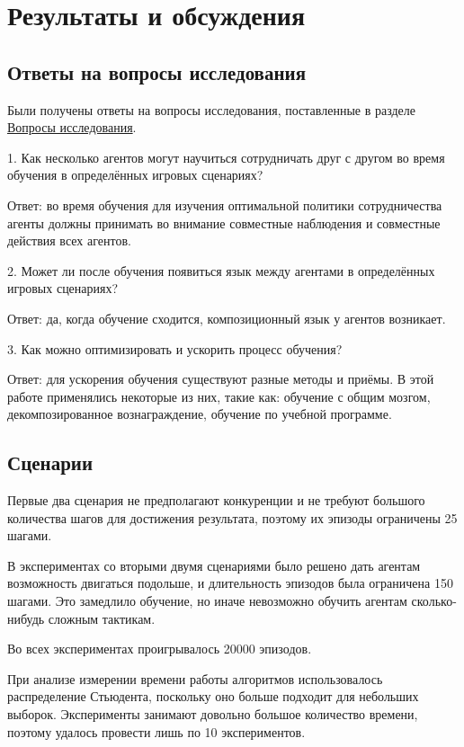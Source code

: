 \chapter{Результаты и обсуждения}


\section{Ответы на вопросы исследования}

Были получены ответы на вопросы исследования, поставленные в разделе \hyperref[intro-questions]{Вопросы исследования}.

1. Как несколько агентов могут научиться сотрудничать друг с другом во время обучения в определённых игровых сценариях?

Ответ: во время обучения для изучения оптимальной политики сотрудничества агенты должны принимать во внимание совместные наблюдения и совместные действия всех агентов.

2. Может ли после обучения появиться язык между агентами в определённых игровых сценариях?

Ответ: да, когда обучение сходится, композиционный язык у агентов возникает.

3. Как можно оптимизировать и ускорить процесс обучения?

Ответ: для ускорения обучения существуют разные методы и приёмы. В этой работе применялись некоторые из них, такие как: обучение с общим мозгом, декомпозированное вознаграждение, обучение по учебной программе.


\section{Сценарии}

Первые два сценария не предполагают конкуренции и не требуют большого количества шагов для достижения результата, поэтому их эпизоды ограничены 25 шагами.

В экспериментах со вторыми двумя сценариями было решено дать агентам возможность двигаться подольше, и длительность эпизодов была ограничена 150 шагами. Это замедлило обучение, но иначе невозможно обучить агентам сколько-нибудь сложным тактикам.

Во всех экспериментах проигрывалось 20000 эпизодов.

При анализе измерении времени работы алгоритмов использовалось распределение Стьюдента, поскольку оно больше подходит для небольших выборок. Эксперименты занимают довольно большое количество времени, поэтому удалось провести лишь по 10 экспериментов.


